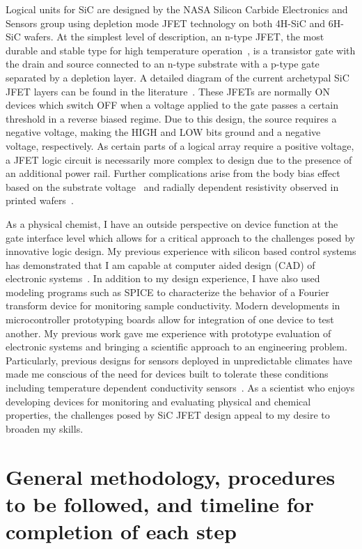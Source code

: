 \documentclass[12pt]{amsart}
\begin{document}
 	Logical units for SiC are designed by the NASA Silicon Carbide Electronics and Sensors group using depletion mode JFET technology on both 4H-SiC and 6H-SiC wafers.  At the simplest level of description, an n-type JFET, the most durable and stable type for high temperature operation~\cite{neudeck_first-order_2016}, is a transistor gate with the drain and source connected to an n-type substrate with a p-type gate separated by a depletion layer.  A detailed diagram of the current archetypal SiC JFET layers can be found in the literature~\cite{neudeck2016first}.  These JFETs are normally ON devices which switch OFF when a voltage applied to the gate passes a certain threshold in a reverse biased regime.  Due to this design, the source requires a negative voltage, making the HIGH and LOW bits ground and a negative voltage, respectively.  As certain parts of a logical array require a positive voltage, a JFET logic circuit is necessarily more complex to design due to the presence of an additional power rail.  Further complications arise from the body bias effect based on the substrate voltage~\cite{neudeck2015experimental} and radially dependent resistivity observed in printed wafers~\cite{neudeck2016first}.  
 	
 	As a physical chemist, I have an outside perspective on device function at the gate interface level which allows for a critical approach to the challenges posed by innovative logic design.  My previous experience with silicon based control systems has demonstrated that I am capable at computer aided design (CAD) of electronic systems~\cite{honeycutt_development_2017}.  In addition to my design experience, I have also used modeling programs such as SPICE to characterize the behavior of a Fourier transform device for monitoring sample conductivity.  Modern developments in microcontroller prototyping boards allow for integration of one device to test another.  My previous work gave me experience with prototype evaluation of electronic systems and bringing a scientific approach to an engineering problem.  Particularly, previous designs for sensors deployed in unpredictable climates have made me conscious of the need for devices built to tolerate these conditions including temperature dependent conductivity sensors~\cite{honeycutt_comparison_2017}.  As a scientist who enjoys developing devices for monitoring and evaluating physical and chemical properties, the challenges posed by SiC JFET design appeal to my desire to broaden my skills.
 	
 	\section{General methodology, procedures to be followed, and timeline for completion of each step}
 	\label{sec:methods}
 	
\end{document}
